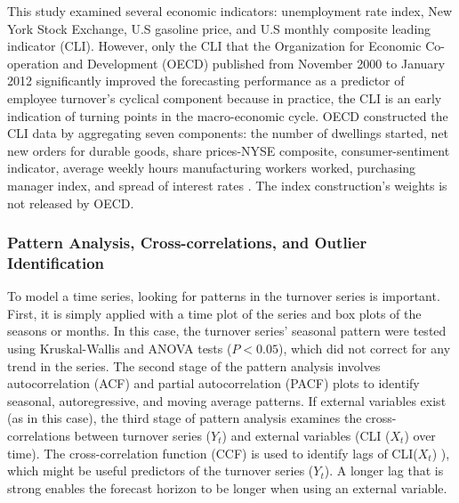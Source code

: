 This study examined several economic indicators: unemployment rate index, New York Stock Exchange, U.S gasoline price, and U.S monthly composite leading indicator (CLI). However, only the CLI that the Organization for Economic Co-operation and Development (OECD) published from November 2000 to January 2012 significantly improved the forecasting performance as a predictor of employee turnover's cyclical component because in practice,  the CLI is an early indication of turning points in the macro-economic cycle. OECD constructed the CLI data by aggregating seven components: the number of dwellings started, net new orders for durable goods, share prices-NYSE composite, consumer-sentiment indicator, average weekly hours manufacturing workers worked, purchasing manager index, and spread of interest rates \citep{oecd2013}. The index construction's weights is not released by OECD.
\subsubsection{Pattern Analysis, Cross-correlations, and Outlier Identification}
 To model a time series, looking for patterns in the turnover series is important. First, it is simply applied with a time plot of the series and box plots of the seasons or months. In this case, the turnover series' seasonal pattern were tested using Kruskal-Wallis and ANOVA tests  ($P<0.05$), which did not correct for any trend in the series. The second stage of the pattern analysis involves autocorrelation (ACF) and partial autocorrelation (PACF) plots to identify seasonal, autoregressive, and moving average patterns. If external variables exist (as in this case), the third stage of pattern analysis examines the cross-correlations between turnover series ($Y_t$) and external variables (CLI ($X_t$) over time). The cross-correlation function (CCF) is used to identify lags of CLI($X_t$) ), which might be useful predictors of the turnover series ($Y_t$).  A longer lag that is strong enables the forecast horizon to be longer when using an external variable.

